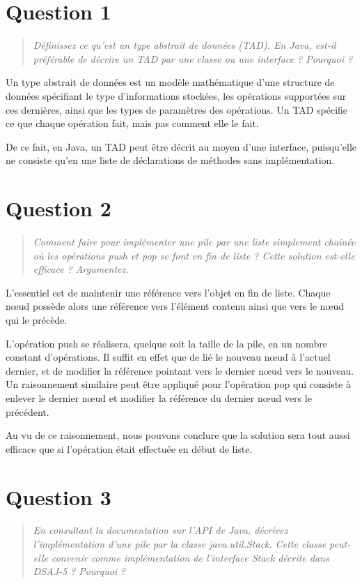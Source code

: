 \documentclass[11pt,a4paper]{article}
\begin{document}
\section{Question 1}
\begin{quotation}
\textit{Définissez ce qu’est un type abstrait de données (TAD). En Java, est-il préférable de décrire un TAD par une classe ou une interface ? Pourquoi ?}
\end{quotation}

Un type abstrait de données est un modèle mathématique d'une structure de données spécifiant le type d'informations stockées, les opérations supportées sur ces dernières, ainsi que les types de paramètres des opérations. Un TAD spécifie ce que chaque opération fait, mais pas comment elle le fait. 

De ce fait, en Java, un TAD peut être décrit au moyen d'une interface, puisqu'elle ne consiste qu'en une liste de déclarations de méthodes sans implémentation.

\section{Question 2} 
\begin{quotation}
\textit{Comment faire pour implémenter une pile par une liste simplement chaînée où les
opérations push et pop se font en fin de liste ? Cette solution est-elle efficace ?
Argumentez.}
\end{quotation}

L'essentiel est de maintenir une référence vers l'objet en fin de liste. Chaque nœud possède alors une référence vers l'élément contenu ainsi que vers le nœud qui le précède.

L'opération push se réalisera, quelque soit la taille de la pile, en un nombre constant d'opérations. Il suffit en effet que de lié le nouveau nœud à l'actuel dernier, et de modifier la référence pointant vers le dernier nœud vers le nouveau. Un raisonnement similaire peut être appliqué pour l'opération pop qui consiste à enlever le dernier nœud et modifier la référence du dernier nœud vers le précédent.

Au vu de ce raisonnement, nous pouvons conclure que la solution sera tout aussi efficace que si l'opération était effectuée en début de liste.

\section{Question 3}
\begin{quotation}
\textit{En consultant la documentation sur l’API de Java, décrivez l’implémentation
d’une pile par la classe java.util.Stack. Cette classe peut-elle convenir
comme implémentation de l’interface Stack décrite dans DSAJ-5 ? Pourquoi ?}
\end{quotation}
\end{document}
